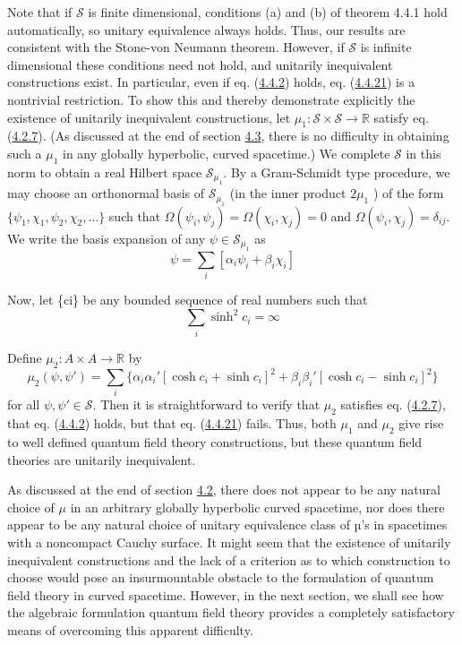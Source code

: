 \documentclass[11pt,a4paper]{article}
\begin{document}
Note that if \(\mathcal{S}\) is finite dimensional, conditions (a) and (b) of theorem 4.4.1 hold automatically, so unitary equivalence always holds. Thus, our results are consistent with the Stone-von Neumann \hypertarget{source-85}{} theorem. However, if \(\mathcal{S}\) is infinite dimensional these conditions need not hold, and unitarily inequivalent constructions exist. In particular, even if eq. (\hyperref[eq:4.4.2]{4.4.2}) holds, eq. (\hyperref[eq:4.4.21]{4.4.21}) is a nontrivial restriction. To show this and thereby demonstrate explicitly the existence of unitarily inequivalent constructions, let \(\mu_1: \mathcal{S}\times\mathcal{S} \to \mathbb{R}\) satisfy eq. (\hyperref[eq:4.2.7]{4.2.7}). (As discussed at the end of section \hyperlink{sec:4.3}{4.3}, there is no difficulty in obtaining such a \(\mu_1\) in any globally hyperbolic, curved spacetime.) We complete \(\mathcal{S}\) in this norm to obtain a real Hilbert space \(\mathcal{S}_{\mu_1}\). By a Gram-Schmidt type procedure, we may choose an orthonormal basis of \(\mathcal{S}_{\mu_1}\) (in the inner product \(2\mu_1\) ) of the form \(\{\psi_1, \chi_1, \psi_2, \chi_2, \dots\}\) such that \(\Omega(\psi_i,\psi_j)=\Omega(\chi_i,\chi_j) = 0\) and \(\Omega(\psi_i, \chi_j) = \delta_{ij}\). We write the basis expansion of any \(\psi \in \mathcal{S}_{\mu_1}\) as
\begin{equation*}
\psi = \sum_{i} [\alpha_i \psi_i + \beta_i \chi_i] \tag{4.4.24}\label{eq:4.4.24}
\end{equation*}

Now, let \{ci\} be any bounded sequence of real numbers such that
\begin{equation*}
\sum_{i} \sinh^2 c_i = \infty \tag{4.4.25}\label{eq:4.4.25}
\end{equation*}

Define \(\mu_2: A \times A \to \mathbb{R}\) by
\begin{equation*}
\mu_2(\psi, \psi') = \sum_i \{\alpha_i \alpha_i'[\cosh c_i + \sinh c_i]^2 + \beta_i \beta_i'[\cosh c_i - \sinh c_i]^2\} \tag{4.4.26}\label{eq:4.4.26}
\end{equation*}
for all \(\psi, \psi' \in \mathcal{S}\). Then it is straightforward to verify that \(\mu_2\) satisfies eq. (\hyperref[eq:4.2.7]{4.2.7}), that eq. (\hyperref[eq:4.4.2]{4.4.2}) holds, but that eq. (\hyperref[eq:4.4.21]{4.4.21}) fails. Thus, both \(\mu_1\) and \(\mu_2\) give rise to well defined quantum field theory constructions, but these quantum field theories are unitarily inequivalent.

As discussed at the end of section \hyperlink{sec:4.2}{4.2}, there does not appear to be any natural choice of \(\mu\) in an arbitrary globally hyperbolic curved spacetime, nor does there appear to be any natural choice of unitary equivalence class of µ's in spacetimes with a noncompact Cauchy surface. It might seem that the existence of unitarily inequivalent constructions and the lack of a criterion as to which construction to choose would pose an insurmountable obstacle to the formulation of quantum field theory in curved spacetime. However, in the next section, we shall see how the algebraic formulation quantum field theory provides a completely satisfactory means of overcoming this apparent difficulty.
\end{document}

